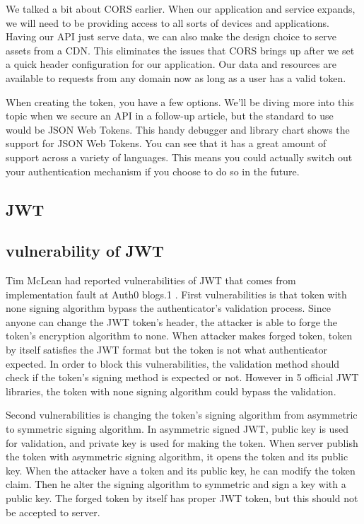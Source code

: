 \documentclass[journal,article,submit,moreauthors,pdftex,10pt,a4paper]{mdpi}
\begin{document}
We talked a bit about CORS earlier. When our application and service expands, we will need to be providing access to all sorts of devices and applications. Having our API just serve data, we can also make the design choice to serve assets from a CDN. This eliminates the issues that CORS brings up after we set a quick header configuration for our application. Our data and resources are available to requests from any domain now as long as a user has a valid token.

When creating the token, you have a few options. We’ll be diving more into this topic when we secure an API in a follow-up article, but the standard to use would be JSON Web Tokens. This handy debugger and library chart shows the support for JSON Web Tokens. You can see that it has a great amount of support across a variety of languages. This means you could actually switch out your authentication mechanism if you choose to do so in the future.

\subsection{JWT}

\subsection{vulnerability of JWT}

Tim McLean had reported vulnerabilities of JWT that comes from implementation fault at Auth0 blogs.1 . First vulnerabilities is that token with none signing algorithm bypass the authenticator's validation process. Since anyone can change the JWT token's header, the attacker is able to forge the token's encryption algorithm to none. When attacker makes forged token, token by itself satisfies the JWT format but the token is not what authenticator expected. In order to block this vulnerabilities, the validation method should check if the token's signing method is expected or not. However in 5 official JWT libraries, the token with none signing algorithm could bypass the validation.

Second vulnerabilities is changing the token's signing algorithm from asymmetric to symmetric signing algorithm. In asymmetric signed JWT, public key is used for validation, and private key is used for making the token. When server publish the token with asymmetric signing algorithm, it opens the token and its public key. When the attacker have a token and its public key, he can modify the token claim. Then he alter the signing algorithm to symmetric and sign a key with a public key. The forged token by itself has proper JWT token, but this should not be accepted to server.
\end{document}
